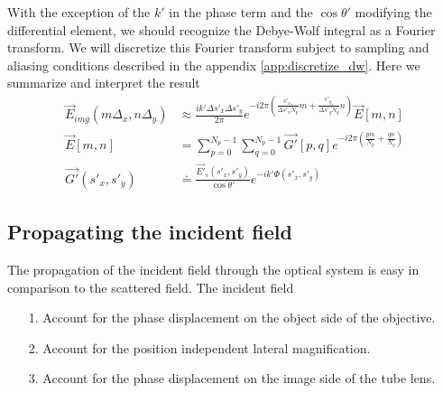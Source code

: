 With the exception of the $k'$ in the phase term and the $\cos{\theta'}$ 
modifying the differential element, we should recognize the
Debye-Wolf integral as a Fourier transform. We will discretize this
Fourier transform subject to sampling and aliasing conditions described
in the appendix \ref{app:discretize_dw}. Here we summarize and interpret the result
\begin{equation}
  \begin{split}
    \vec{E}_{img}( m \Delta_x, n \Delta_y) & \approx \frac{i k' \Delta s'_x \Delta s'_y}{2 \pi} e^{-i2\pi \left ( \frac{s'_{x_o}}{\Delta s'_x N_p} m + \frac{s'_{y_o}}{\Delta s'_yN_q} n \right ) } \vec{E}\left [ m, n \right ] \\
    \vec{E}\left [ m,n \right ] & = \sum_{p=0}^{N_p-1}\sum_{q=0}^{N_p-1}\vec{G'}\left [p,q\right ] e^{-i2\pi \left ( \frac{pm}{N_p}+\frac{qn}{N_q} \right ) } \\
    \vec{G'}(s'_x,s'_y) & \doteq \frac{\vec{E'}_s(s'_x,s'_y)}{\cos{\theta'}}e^{-ik'\Phi(s'_x,s'_y)}
  \end{split}
\end{equation}


\subsection{Propagating the incident field}

The propagation of the incident field through the optical system is easy in
comparison to the scattered field. The incident field 

\begin{enumerate}
\item[1.] Account for the phase displacement on the object side of the objective.
\item[2.] Account for the position independent lateral magnification.
\item[3.] Account for the phase displacement on the image side of the tube lens.
\end{enumerate}



